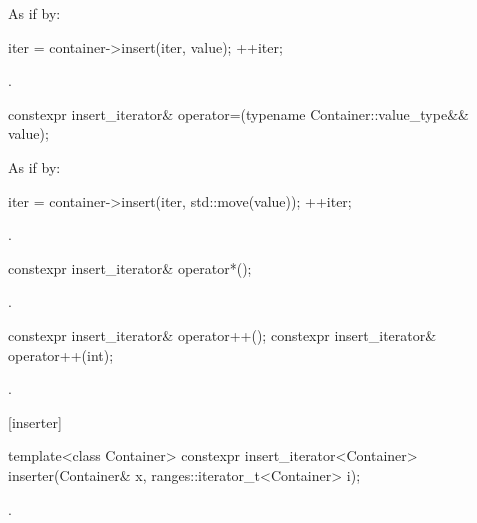 \begin{itemdescr}
\pnum
\effects
As if by:
\begin{codeblock}
iter = container->insert(iter, value);
++iter;
\end{codeblock}

\pnum
\returns
{}.
\end{itemdescr}

%
\begin{itemdecl}
constexpr insert_iterator& operator=(typename Container::value_type&& value);
\end{itemdecl}

\begin{itemdescr}
\pnum
\effects
As if by:
\begin{codeblock}
iter = container->insert(iter, std::move(value));
++iter;
\end{codeblock}

\pnum
\returns
{}.
\end{itemdescr}

%
\begin{itemdecl}
constexpr insert_iterator& operator*();
\end{itemdecl}

\begin{itemdescr}
\pnum
\returns
{}.
\end{itemdescr}

%
\begin{itemdecl}
constexpr insert_iterator& operator++();
constexpr insert_iterator& operator++(int);
\end{itemdecl}

\begin{itemdescr}
\pnum
\returns
{}.
\end{itemdescr}

[inserter]{}

%
\begin{itemdecl}
template<class Container>
  constexpr insert_iterator<Container>
    inserter(Container& x, ranges::iterator_t<Container> i);
\end{itemdecl}

\begin{itemdescr}
\pnum
\returns
{}.
\end{itemdescr}

